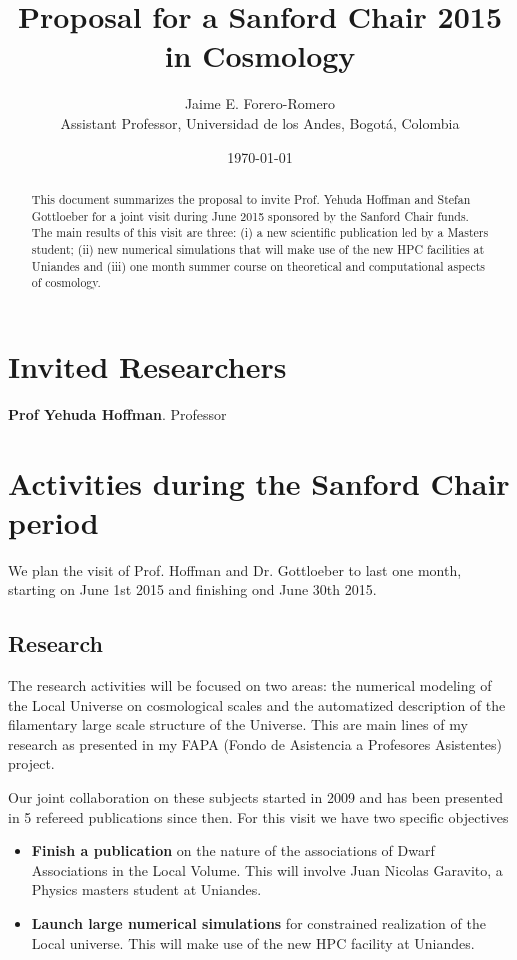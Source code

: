 \documentclass[12pt]{article}
\title{Proposal for a Sanford Chair 2015 in Cosmology}
\author{Jaime E. Forero-Romero\\{\small Assistant Professor, Universidad de los Andes, Bogot\'a, Colombia}}
\date{\today}
\begin{document}
\maketitle

\begin{abstract}
This document summarizes the proposal to invite Prof. Yehuda Hoffman
and Stefan Gottloeber for a joint visit during June 2015 sponsored by the
Sanford Chair funds.  The main results of this visit are three: (i) a new
scientific publication led by a Masters student; (ii) new numerical
simulations that will make use of the new HPC facilities at Uniandes
and (iii) one month summer course on theoretical and computational aspects of
cosmology.  
\end{abstract}


\section{Invited Researchers}

{\bf Prof Yehuda Hoffman}. Professor

\section{Activities during the Sanford Chair period}

We plan the visit of Prof. Hoffman and Dr. Gottloeber to last one
month, starting on June 1st 2015 and finishing ond June 30th 2015. 

\subsection{Research}

The research activities  will be focused on two areas: the 
numerical modeling of the Local Universe on cosmological scales and
the automatized description of the filamentary large scale structure of the
Universe. This are main lines of my research as presented in my FAPA
(Fondo de Asistencia a Profesores Asistentes) project. 

Our joint collaboration on these subjects started in 2009 and has
been presented in 5 refereed publications since then. For this visit
we have two specific objectives
\begin{itemize}
\item {\bf Finish a publication} on the nature of the associations of Dwarf
Associations in the Local Volume. This will involve Juan Nicolas
Garavito, a Physics masters student at Uniandes.
\item {\bf Launch large numerical simulations} for constrained realization
of the Local universe. This will make use of the new HPC facility at Uniandes.
\end{itemize} 
\end{document}
